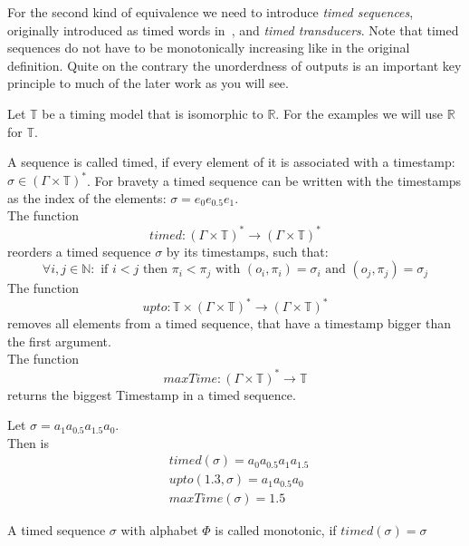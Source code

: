 For the second kind of equivalence we need to introduce \emph{timed sequences}, originally introduced as timed words in~\cite{Alur1994}, and \emph{timed transducers}.
Note that timed sequences do not have to be monotonically increasing like in the original definition.
Quite on the contrary the unorderdness of outputs is an important key principle to much of the later work as you will see.

Let \(\mathbb{T}\) be a timing model that is isomorphic to \(\mathbb{R}\).
For the examples we will use \(\mathbb{R}\) for \(\mathbb{T}\).

\begin{definition}[name = Timed Sequence]\label{def:timed_sequence}
  A sequence is called timed, if every element of it is associated with a timestamp: \(\sigma \in {(\Gamma\times\mathbb{T})}^*\).
  For bravety a timed sequence can be written with the timestamps as the index of the elements: \(\sigma = e_0e_{0.5}e_1 \).\\
  The function
  \[\mathit{timed: } {(\Gamma \times \mathbb{T})}^* \rightarrow {(\Gamma \times \mathbb{T})}^* \]
  reorders a timed sequence \(\sigma\) by its timestamps, such that:
  \[ \forall i,j \in \mathbb{N}:\text{ if } i < j \text{ then } \pi_i < \pi_j \text{ with } (o_i, \pi_i) = \sigma_i \text{ and } (o_j, \pi_j) = \sigma_j \]
  The function
  \[\mathit{upto: } \mathbb{T} \times {(\Gamma\times\mathbb{T})}^* \rightarrow {(\Gamma\times\mathbb{T})}^*\]
  removes all elements from a timed sequence, that have a timestamp bigger than the first argument.\\
  The function
  \[\mathit{maxTime: } {(\Gamma\times\mathbb{T})}^* \rightarrow \mathbb{T} \]
  returns the biggest Timestamp in a timed sequence.
\end{definition}

\begin{exmp}[name=Functions on Timed Sequences]
Let \(\sigma = a_1a_{0.5}a_{1.5}a_0\).\\
  Then is
    \begin{align*}
      &\mathit{timed} (\sigma) = a_0a_{0.5}a_1a_{1.5}\ \\
      &\mathit{upto} (1.3,\sigma) = a_1a_{0.5}a_0 \\
      &\mathit{maxTime} (\sigma) = 1.5
    \end{align*}
\end{exmp}

\begin{definition}[name = Monotonicity of Timed Sequences]\label{def:monotonicity_timed_sequences}
  A timed sequence \(\sigma\) with alphabet \(\Phi\) is called monotonic,
  if \( \mathit{timed}(\sigma) = \sigma\)
\end{definition}

